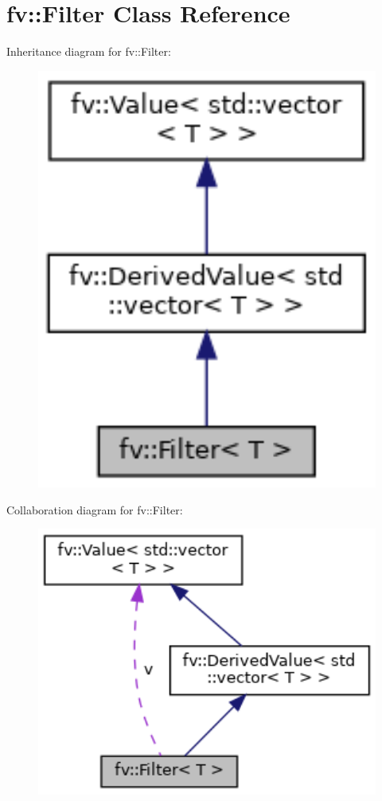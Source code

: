 \hypertarget{classfv_1_1Filter}{}\section{fv\+:\+:Filter Class Reference}
\label{classfv_1_1Filter}


Inheritance diagram for fv\+:\+:Filter\+:
\nopagebreak
\begin{figure}[H]
\begin{center}
\leavevmode
\includegraphics[width=320pt]{classfv_1_1Filter__inherit__graph}
\end{center}
\end{figure}


Collaboration diagram for fv\+:\+:Filter\+:
\nopagebreak
\begin{figure}[H]
\begin{center}
\leavevmode
\includegraphics[width=350pt]{classfv_1_1Filter__coll__graph}
\end{center}
\end{figure}
